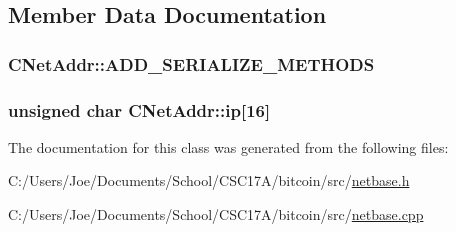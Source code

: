 \subsection{Member Data Documentation}
\hypertarget{class_c_net_addr_ab08e22719f96b42c61e998158a895e5f}{}
\subsubsection[{A\+D\+D\+\_\+\+S\+E\+R\+I\+A\+L\+I\+Z\+E\+\_\+\+M\+E\+T\+H\+O\+D\+S}]{\setlength{\rightskip}{0pt plus 5cm}C\+Net\+Addr\+::\+A\+D\+D\+\_\+\+S\+E\+R\+I\+A\+L\+I\+Z\+E\+\_\+\+M\+E\+T\+H\+O\+D\+S}\label{class_c_net_addr_ab08e22719f96b42c61e998158a895e5f}
\hypertarget{class_c_net_addr_acff7ce68f33f8dfbfe6d79d80928d417}{}
\subsubsection[{ip}]{\setlength{\rightskip}{0pt plus 5cm}unsigned char C\+Net\+Addr\+::ip\mbox{[}16\mbox{]}\hspace{0.3cm}{\ttfamily [protected]}}\label{class_c_net_addr_acff7ce68f33f8dfbfe6d79d80928d417}


The documentation for this class was generated from the following files\+:\begin{DoxyCompactItemize}
\item 
C\+:/\+Users/\+Joe/\+Documents/\+School/\+C\+S\+C17\+A/bitcoin/src/\hyperlink{netbase_8h}{netbase.\+h}\item 
C\+:/\+Users/\+Joe/\+Documents/\+School/\+C\+S\+C17\+A/bitcoin/src/\hyperlink{netbase_8cpp}{netbase.\+cpp}\end{DoxyCompactItemize}
